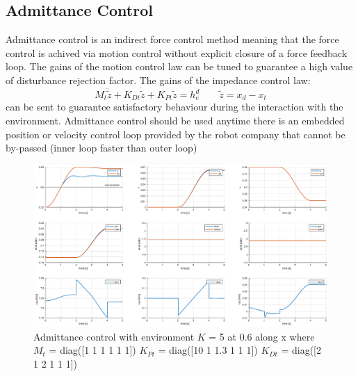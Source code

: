 \documentclass[a4paper,12pt]{article}
\begin{document}
\subsection{Admittance Control}
Admittance control is an indirect force control method meaning that the force control is achived via motion control without explicit closure of a force feedback loop. The gains of the motion control law can be tuned to guarantee a high value of disturbance rejection factor. The gains of the impedance control law:
\[
    M_t\ddot{\tilde{z}} + K_{Dt}\dot{\tilde{z}} + K_{Pt}\tilde{z} = h_e^d \qquad \tilde{z} = x_d - x_t
\]
can be sent to guarantee satisfactory behaviour during the interaction with the environment. Admittance control should be used anytime there is an embedded position or velocity control loop provided by the robot company that cannot be by-passed (inner loop faster than outer loop)
\begin{figure}[H]
    \begin{center}
        \hspace*{-4.5cm}
        \includegraphics[scale=0.5]{images/admittance_soft.eps}
    \end{center}
    \caption{Admittance control with environment $K$ = 5 at 0.6 along x 
    where $M_t$ = diag([1 1 1 1 1 1]) $K_{Pt}$ = diag([10 1 1.3 1 1 1]) $K_{Dt}$ = diag([2 1 2 1 1 1])}
    \label{fig:admittance_soft}
\end{figure}
\end{document}
